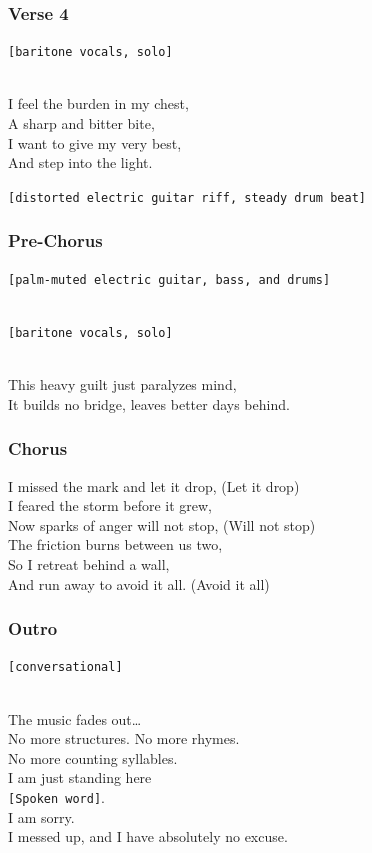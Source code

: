 \subsubsection{Verse 4}\label{verse-4-3}

\texttt{{[}baritone\ vocals,\ solo{]}}\strut \\
I feel the burden in my chest,\\
A sharp and bitter bite,\\
I want to give my very best,\\
And step into the light.

\texttt{{[}distorted\ electric\ guitar\ riff,\ steady\ drum\ beat{]}}

\subsubsection{Pre-Chorus}\label{pre-chorus-13}

\texttt{{[}palm-muted\ electric\ guitar,\ bass,\ and\ drums{]}}\strut \\
\texttt{{[}baritone\ vocals,\ solo{]}}\strut \\
This heavy guilt just paralyzes mind,\\
It builds no bridge, leaves better days behind.

\subsubsection{Chorus}\label{chorus-28}

I missed the mark and let it drop, (Let it drop)\\
I feared the storm before it grew,\\
Now sparks of anger will not stop, (Will not stop)\\
The friction burns between us two,\\
So I retreat behind a wall,\\
And run away to avoid it all. (Avoid it all)

\subsubsection{Outro}\label{outro-5}

\texttt{{[}conversational{]}}\strut \\
The music fades out\ldots{}\\
No more structures. No more rhymes.\\
No more counting syllables.\\
I am just standing here\\
\texttt{{[}Spoken\ word{]}}.\\
I am sorry.\\
I messed up, and I have absolutely no excuse.

